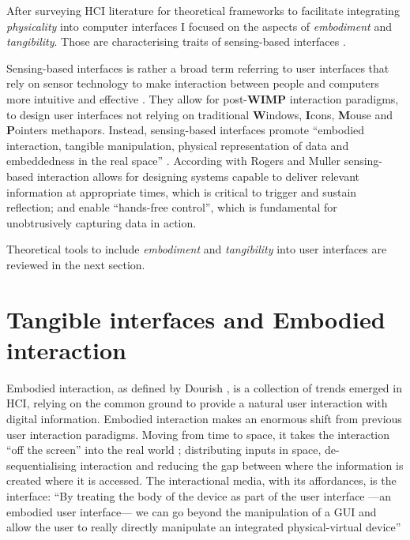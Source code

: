 After surveying HCI literature for theoretical frameworks to facilitate
integrating \emph{physicality} into computer interfaces I focused on the
aspects of \emph{embodiment} and \emph{tangibility}. Those are
characterising traits of sensing-based interfaces
\autocite{Benford:2005bo}.

Sensing-based interfaces is rather a broad term referring to user
interfaces that rely on sensor technology to make interaction between
people and computers more intuitive and effective
\autocite{Zhai:2005jm}. They allow for post-\textbf{WIMP}
\autocite{VanDam:1997tz} interaction paradigms, to design user
interfaces not relying on traditional \textbf{W}indows, \textbf{I}cons,
\textbf{M}ouse and \textbf{P}ointers methapors. Instead, sensing-based
interfaces promote ``embodied interaction, tangible manipulation,
physical representation of data and embeddedness in the real space''
\autocite{Hornecker:2006uq}. According with Rogers and Muller
\autocite*{Rogers:2006te} sensing-based interaction allows for designing
systems capable to deliver relevant information at appropriate times,
which is critical to trigger and sustain reflection; and enable
``hands-free control'', which is fundamental for unobtrusively capturing
data in action.

Theoretical tools to include \emph{embodiment} and \emph{tangibility}
into user interfaces are reviewed in the next section.

\section{Tangible interfaces and Embodied
interaction}\label{tangible-interfaces-and-embodied-interaction}

Embodied interaction, as defined by Dourish \autocite{Dourish:2001vc},
is a collection of trends emerged in HCI, relying on the common ground
to provide a natural user interaction with digital information. Embodied
interaction makes an enormous shift from previous user interaction
paradigms. Moving from time to space, it takes the interaction ``off the
screen'' into the real world \autocite{Dourish:2001vc}; distributing
inputs in space, de-sequentialising interaction and reducing the gap
between where the information is created where it is accessed. The
interactional media, with its affordances, is the interface: ``By
treating the body of the device as part of the user interface ---an
embodied user interface--- we can go beyond the manipulation of a GUI
and allow the user to really directly manipulate an integrated
physical-virtual device'' \autocite{Fishkin:2000df}

